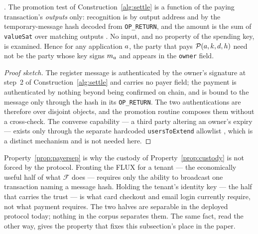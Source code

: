 \begin{property}
\label{prop:payersep}
\shipped. The promotion test of Construction~\ref{alg:settle} is a function of the paying
transaction's \emph{outputs} only: recognition is by output address and by the temporary-message
hash decoded from \texttt{OP\_RETURN}, and the amount is the sum of \texttt{valueSat} over matching
outputs . No input, and no property
of the spending key, is examined. Hence for any application $a$, the party that pays
$\mathcal{P}(a,k,d,h)$ need not be the party whose key signs $m_{a}$ and appears in the
\texttt{owner} field.
\end{property}

\begin{proof}[Proof sketch]
The register message is authenticated by the owner's signature at step~2 of
Construction~\ref{alg:settle} and carries no payer field; the payment is authenticated by nothing
beyond being confirmed on chain, and is bound to the message only through the hash in its
\texttt{OP\_RETURN}. The two authentications are therefore over disjoint objects, and the promotion
routine composes them without a cross-check. The converse capability --- a third party altering an
owner's expiry --- exists only through the separate hardcoded \texttt{usersToExtend} allowlist
, which is a distinct mechanism and is not needed here.
\end{proof}

Property~\ref{prop:payersep} is why the custody of Property~\ref{prop:custody} is not forced by the
protocol. Fronting the FLUX for a tenant --- the economically useful half of what $\mathcal{F}$ does
--- requires only the ability to broadcast one transaction naming a message hash. Holding the
tenant's identity key --- the half that carries the trust --- is what card checkout and email login
currently require, not what payment requires. The two halves are separable in the deployed protocol
today; nothing in the corpus separates them. The same fact, read the other way, gives the property
that fixes this subsection's place in the paper.

